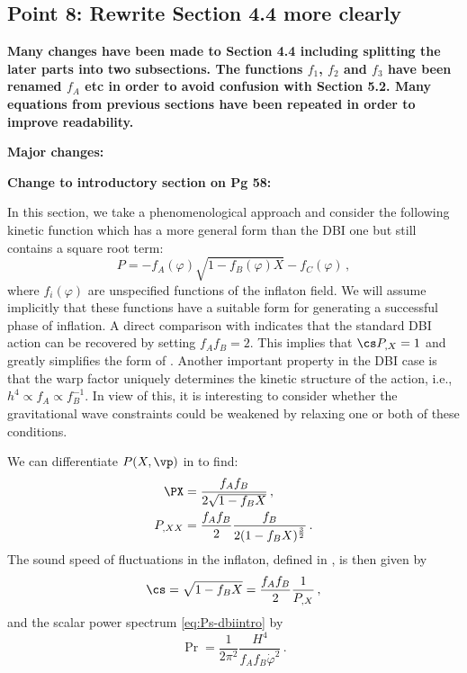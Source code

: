 \subsection{Point 8: Rewrite Section 4.4 more clearly}
\textbf{Many changes have been made to Section 4.4 including splitting the later parts into two
subsections. The functions $f_1$, $f_2$ and $f_3$ have been renamed $f_A$ etc in order to avoid
confusion with Section 5.2. Many equations from previous sections have been repeated in order to
improve readability.}

\textbf{Major changes:}

\textbf{Change to introductory section on Pg 58:}

In this section, we take a phenomenological 
approach and consider the following kinetic function which has a more general form than the DBI one
but still contains a square root term:
% 
\begin{equation}
\label{eq:genaction-corr}
P= -f_A (\varphi ) \sqrt{1-f_B (\varphi ) X} -f_C (\varphi) \,,
\end{equation}
% 
where $f_i (\varphi )$ are unspecified functions of the inflaton 
field. We will assume 
implicitly that these functions have a suitable form for 
generating a successful phase of inflation.
A direct comparison with  
indicates that the standard DBI action can be recovered by setting $f_A f_B =2$. This implies
that $\cs P_{,X} =1$ and greatly simplifies the form of . 
Another important property in the DBI case is that the warp factor uniquely determines 
the kinetic structure of the action, i.e., $h^4 \propto f_A \propto f_B^{-1}$.  
In view of this, it is interesting to consider whether
the gravitational wave constraints could be weakened by relaxing one 
or both of these conditions. 

% 
% 

We can differentiate $P(X, \vp)$ in  to find:
% 
\begin{align}
 \PX &= \frac{f_A f_B}{2\sqrt{1-f_B X}} \,, \\
 P_{,XX} &= \frac{f_A f_B}{2}\frac{f_B}{2(1-f_B X)^{\frac{3}{2}}} \,.
\end{align}
% 
% 
The sound speed of fluctuations in 
the inflaton, defined in , is then given by
%  
\begin{equation}
\label{eq:cs-corr}
\cs = \sqrt{1-f_B X} = \frac{f_Af_B}{2} \frac{1}{P_{,X}}  \,,
\end{equation}
% 
and the scalar power spectrum \eqref{eq:Ps-dbiintro} by
% 
\begin{equation}
\label{eq:spectrum-corr}
\Pr = \frac{1}{2\pi^2}\frac{H^4}{f_Af_B\dot{\varphi}^2}  \,.
\end{equation}

